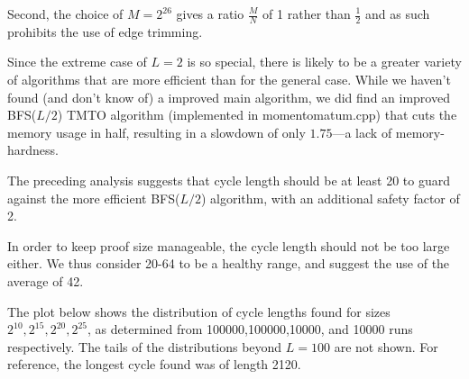 \documentclass{beamer}
\begin{document}
Second, the choice of $M=2^{26}$ gives a ratio $\frac{M}{N}$ of 1 rather than $\frac{1}{2}$ and as such
prohibits the use of edge trimming.

Since the extreme case of $L=2$ is so special, there is likely to be a greater variety of algorithms that are more
efficient than for the general case. While we haven't found (and don't know of) a improved main algorithm,
we did find an improved BFS($L/2$) TMTO algorithm (implemented in momentomatum.cpp)
that cuts the memory usage in half, resulting in a slowdown of only $1.75$---a lack of memory-hardness.

The preceding analysis suggests that cycle length should be at least 20 to guard against the more efficient
BFS($L/2$) algorithm, with an additional safety factor of 2.

In order to keep proof size manageable, the cycle length should not be too large either.
We thus consider 20-64 to be a healthy range, and suggest the use of the average of 42.

The plot below shows the distribution of cycle lengths found for sizes $2^{10},2^{15},2^{20},2^{25}$,
as determined from 100000,100000,10000, and 10000 runs respectively. The tails of the distributions
beyond $L=100$ are not shown. For reference, the longest cycle found was of length 2120.
\end{document}
